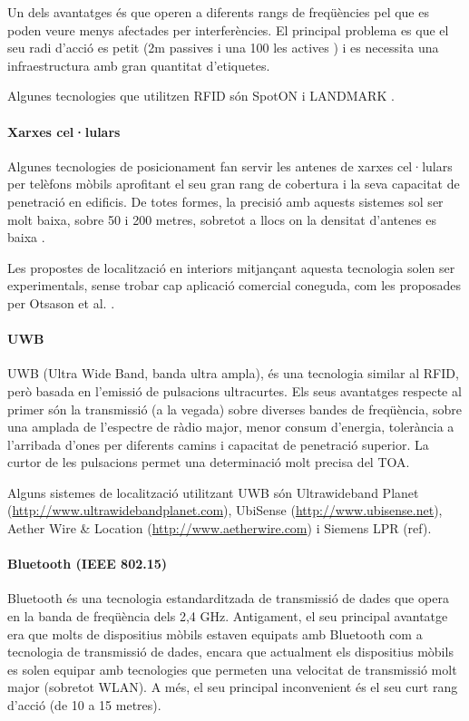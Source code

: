 Un dels avantatges és que operen a diferents rangs de freqüències pel que es poden veure menys afectades per interferències. El principal problema es que el seu radi d'acció es petit (2m passives i una 100 les actives \cite{chan}) i es necessita una infraestructura amb gran quantitat d'etiquetes.

Algunes tecnologies que utilitzen RFID són SpotON \cite{hightower} i LANDMARK \cite{ni}.

\paragraph{Xarxes cel·lulars}

Algunes tecnologies de posicionament fan servir les antenes de xarxes cel·lulars per telèfons mòbils aprofitant el seu gran rang de cobertura i la seva capacitat de penetració en edificis. De totes formes, la precisió amb aquests sistemes sol ser molt baixa, sobre 50 i 200 metres, sobretot a llocs on la densitat d'antenes es baixa \cite{caffery}.

Les propostes de localització en interiors mitjançant aquesta tecnologia solen ser experimentals, sense trobar cap aplicació comercial coneguda, com les proposades per Otsason et al. \cite{otsason}.

\paragraph{UWB}

UWB (Ultra Wide Band, banda ultra ampla), és una tecnologia similar al RFID, però basada en l'emissió de pulsacions ultracurtes. Els seus avantatges respecte al primer són la transmissió (a la vegada) sobre diverses bandes de freqüència, sobre una amplada de l'espectre de ràdio major, menor consum d'energia, tolerància a l'arribada d'ones per diferents camins i capacitat de penetració superior. La curtor de les pulsacions permet una determinació molt precisa del TOA.

Alguns sistemes de localització utilitzant UWB són Ultrawideband Planet (\url{http://www.ultrawidebandplanet.com}), UbiSense (\url{http://www.ubisense.net}), Aether Wire \& Location (\url{http://www.aetherwire.com}) i Siemens LPR (ref).

\paragraph{Bluetooth (IEEE 802.15)}

Bluetooth és una tecnologia estandarditzada de transmissió de dades que opera en la banda de freqüència dels 2,4 GHz. Antigament, el seu principal avantatge era que molts de dispositius mòbils estaven equipats amb Bluetooth com a tecnologia de transmissió de dades, encara que actualment els dispositius mòbils es solen equipar amb tecnologies que permeten una velocitat de transmissió molt major (sobretot WLAN). A més, el seu principal inconvenient és el seu curt rang d'acció (de 10 a 15 metres).


